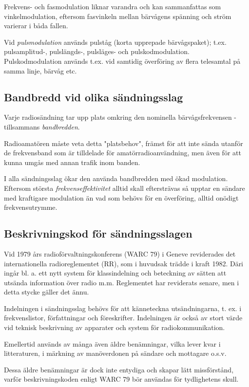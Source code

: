 Frekvens- och fasmodulation liknar varandra och kan sammanfattas som
vinkelmodulation, eftersom fasvinkeln mellan bärvågens spänning och ström
varierar i båda fallen.

Vid \emph{pulsmodulation} används pulståg (korta upprepade bärvågspaket); t.ex.
pulsamplitud-, pulslängds-, pulsläges- och pulskodmodulation. Pulskodmodulation
används t.ex. vid samtidig överföring av flera telesamtal på samma linje,
bärvåg etc.

\subsection{Bandbredd vid olika sändningsslag}

Varje radiosändning tar upp plats omkring den nominella bärvågsfrekvensen -
tillsammans \emph{bandbredden}.

Radioamatören måste veta detta "platsbehov", främst för att inte sända utanför
de frekvensband som är tilldelade för amatörradioanvändning, men även för att
kunna umgås med annan trafik inom banden.

I alla sändningsslag ökar den använda bandbredden med ökad modulation. Eftersom
största \emph{frekvenseffektivitet} alltid skall eftersträvas så upptar en
sändare med kraftigare modulation än vad som behövs för en överföring, alltid
onödigt frekvensutrymme.

\subsection{Beskrivningskod för sändningsslagen}

Vid 1979 års radioförvaltningskonferens (WARC 79) i Geneve reviderades det
internationella radioreglementet (RR), som i huvudsak trädde i kraft 1982.
Däri ingår bl. a. ett nytt system för klassindelning och beteckning av sätten
att utsända information över radio m.m. Reglementet har reviderats senare, men
i detta stycke gäller det ännu.

Indelningen i sändningsslag behövs för att känneteckna utsändningarna, t. ex. i
frekvenslistor, författningar och föreskrifter. Indelningen är också av stort
värde vid teknisk beskrivning av apparater och system för radiokommunikation.

Emellertid används av många även äldre benämningar, vilka lever kvar i
litteraturen, i märkning av manöverdonen på sändare och mottagare o.s.v.

Dessa äldre benämningar är dock inte entydiga och skapar lätt missförstånd,
varför beskrivningskoden enligt WARC 79 bör användas för tydlighetens skull.

